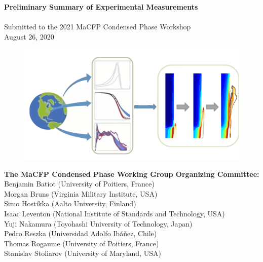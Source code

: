 \documentclass{book}
\begin{document}


\pagestyle{empty}

\vspace*{2in}

\begin{center}
{\bf Preliminary Summary of Experimental Measurements} \\
\hspace{1in} \\
Submitted to the 2021 MaCFP Condensed Phase Workshop \\
August 26, 2020 \\
\end{center}

\begin{figure}
  \centering
  \includegraphics[width=6in]{FIGURES/MaCFP_Logo}
  \label{Cover_Image}
\end{figure}

\vfill

\begin{flushright}
{\bf The MaCFP Condensed Phase Working Group Organizing Committee:} \\
Benjamin Batiot (University of Poitiers, France) \\
Morgan Bruns (Virginia Military Institute, USA) \\
Simo Hostikka (Aalto University, Finland) \\
Isaac Leventon (National Institute of Standards and Technology, USA) \\
Yuji Nakamura (Toyohashi University of Technology, Japan) \\
Pedro Reszka (Universidad Adolfo Ibáñez, Chile) \\
Thomas Rogaume (University of Poitiers, France) \\
Stanislav Stoliarov (University of Maryland, USA)
\end{flushright}
\end{document}
